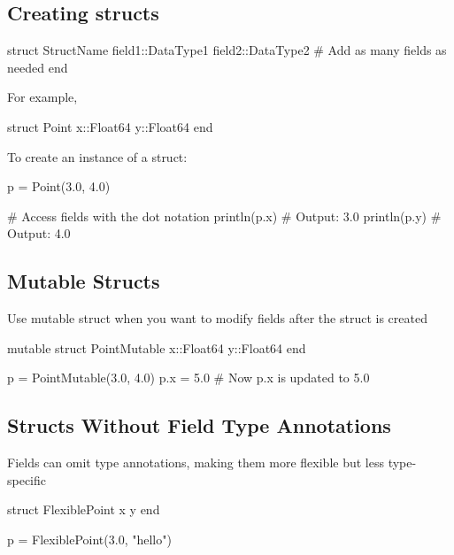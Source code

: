 \documentclass{report}
\begin{document}
     \bigbreak \noindent 
     \subsection{Creating structs}
     \bigbreak \noindent 
     \begin{jlcode}
         struct StructName
             field1::DataType1
             field2::DataType2
             # Add as many fields as needed
         end
     \end{jlcode}
     \bigbreak \noindent 
     For example,
     \bigbreak \noindent 
     \begin{jlcode}
         struct Point
             x::Float64
             y::Float64
         end
     \end{jlcode}
     \bigbreak \noindent 
     To create an instance of a struct:
     \bigbreak \noindent 
     \begin{jlcode}
     p = Point(3.0, 4.0)

     # Access fields with the dot notation
     println(p.x)  # Output: 3.0
     println(p.y)  # Output: 4.0
     \end{jlcode}

     \bigbreak \noindent 
     \subsection{Mutable Structs}
     \bigbreak \noindent 
     Use mutable struct when you want to modify fields after the struct is created
     \bigbreak \noindent 
     \begin{jlcode}
         mutable struct PointMutable
             x::Float64
             y::Float64
         end

         p = PointMutable(3.0, 4.0)
         p.x = 5.0  # Now p.x is updated to 5.0
     \end{jlcode}

     \bigbreak \noindent 
     \subsection{Structs Without Field Type Annotations}
     \bigbreak \noindent 
     Fields can omit type annotations, making them more flexible but less type-specific
     \bigbreak \noindent 
     \begin{jlcode}
     struct FlexiblePoint
         x
         y
     end

     p = FlexiblePoint(3.0, "hello")
     \end{jlcode}
\end{document}
